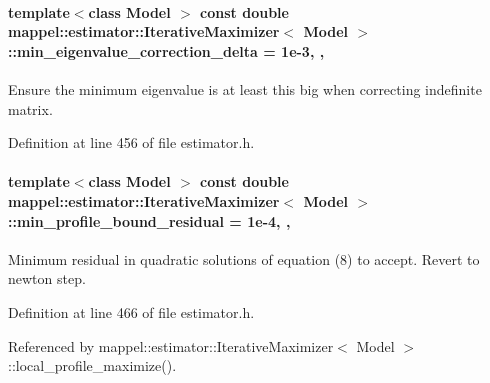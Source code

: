 \paragraph[{\texorpdfstring{min\+\_\+eigenvalue\+\_\+correction\+\_\+delta}{min_eigenvalue_correction_delta}}]{\setlength{\rightskip}{0pt plus 5cm}template$<$class Model $>$ const double {\bf mappel\+::estimator\+::\+Iterative\+Maximizer}$<$ Model $>$\+::min\+\_\+eigenvalue\+\_\+correction\+\_\+delta = 1e-\/3\hspace{0.3cm}{\ttfamily [static]}, {\ttfamily [protected]}, {\ttfamily [inherited]}}\hypertarget{classmappel_1_1estimator_1_1IterativeMaximizer_a9c23c94f649688d01e9eb938a692c6f5}{}\label{classmappel_1_1estimator_1_1IterativeMaximizer_a9c23c94f649688d01e9eb938a692c6f5}


Ensure the minimum eigenvalue is at least this big when correcting indefinite matrix. 



Definition at line 456 of file estimator.\+h.

\paragraph[{\texorpdfstring{min\+\_\+profile\+\_\+bound\+\_\+residual}{min_profile_bound_residual}}]{\setlength{\rightskip}{0pt plus 5cm}template$<$class Model $>$ const double {\bf mappel\+::estimator\+::\+Iterative\+Maximizer}$<$ Model $>$\+::min\+\_\+profile\+\_\+bound\+\_\+residual = 1e-\/4\hspace{0.3cm}{\ttfamily [static]}, {\ttfamily [protected]}, {\ttfamily [inherited]}}\hypertarget{classmappel_1_1estimator_1_1IterativeMaximizer_a04b56451448fa004f4ce3da97bfde9ec}{}\label{classmappel_1_1estimator_1_1IterativeMaximizer_a04b56451448fa004f4ce3da97bfde9ec}


Minimum residual in quadratic solutions of equation (8) to accept. Revert to newton step. 



Definition at line 466 of file estimator.\+h.



Referenced by mappel\+::estimator\+::\+Iterative\+Maximizer$<$ Model $>$\+::local\+\_\+profile\+\_\+maximize().

